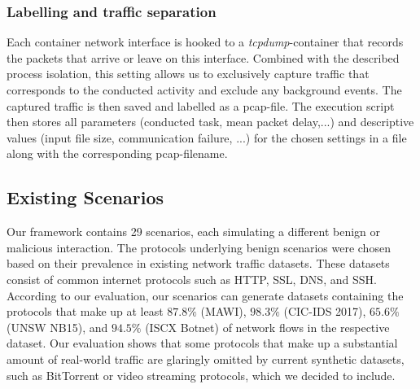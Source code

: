 \documentclass[sigconf]{acmart}
\begin{document}
\subsubsection*{Labelling and traffic separation}

Each container network interface is hooked to a \emph{tcpdump}-container that records the packets that arrive or leave on this interface. Combined with the described process isolation, this setting allows us to exclusively capture traffic that corresponds to the conducted activity and exclude any background events. The captured traffic is then saved and labelled as a pcap-file. The execution script then stores all parameters (conducted task, mean packet delay,...) and descriptive values (input file size, communication failure, ...) for the chosen settings in a file along with the corresponding pcap-filename.




\subsection{Existing Scenarios}\label{Sec:ExistScen}


Our framework contains 29 scenarios, each simulating a different benign or malicious interaction. The protocols underlying benign scenarios were chosen based on their prevalence in existing network traffic datasets.%
These datasets consist of common internet protocols such as HTTP, SSL, DNS, and SSH. According to our evaluation, our scenarios can generate datasets containing the protocols that make up at least $87.8\%$ (MAWI), $98.3\%$ (CIC-IDS 2017), $65.6\%$ (UNSW NB15), and $94.5\%$ (ISCX Botnet) of network flows in the respective dataset.
Our evaluation shows that some protocols that make up a substantial amount of real-world traffic are glaringly omitted by current synthetic datasets, such as BitTorrent or video streaming protocols, which we decided to include.
\end{document}
